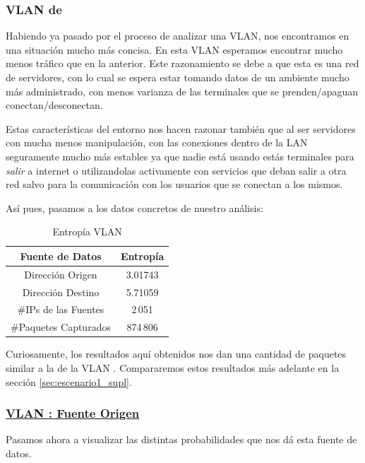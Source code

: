 \subsubsection{VLAN de~}
\par Habiendo ya pasado por el proceso de analizar una VLAN, nos encontramos en una
situaci\'on mucho m\'as concisa. En esta VLAN esperamos encontrar mucho menos tr\'afico
que en la anterior. Este razonamiento se debe a que esta es una red de servidores, con
lo cual se espera estar tomando datos de un ambiente mucho m\'as administrado, con
menos varianza de las terminales que se prenden/apaguan conectan/desconectan.

\par Estas caracter\'isticas del entorno nos hacen razonar tambi\'en que al ser
servidores con mucha menos manipulaci\'on, con las conexiones dentro de la LAN
seguramente mucho m\'as estables ya que nadie est\'a usando est\'as terminales
para \textit{salir} a internet o utilizandolas activamente con servicios que
deban salir a otra red salvo para la comunicaci\'on con los usuarios que se conectan
a los mismos.

\par As\'i pues, pasamos a los datos concretos de nuestro an\'alisis:

\begin{table}[!h]
\centering
  \begin{tabular}{c c}
    Fuente de Datos & Entrop\'ia \\
    \hline\hline
    Direcci\'on Origen & 3.01743 \\
    Direcci\'on Destino & 5.71059 \\
    \hline\hline
    \#IPs de las Fuentes & 2\,051\\
    \#Paquetes Capturados & 874\,806\\
    \hline
    \end{tabular}
  \bigskip
  \caption{Entrop\'ia VLAN }
  \label{tab:vlan20_entropia}
\end{table}

\par Curiosamente, los resultados aqu\'i obtenidos nos dan una cantidad de paquetes
similar a la de la VLAN . Compararemos estos resultados m\'as
adelante en la secci\'on \ref{sec:escenario1_supl}.


\subsubsection*{\underline{VLAN : Fuente Origen}}\label{subsubsec:vlan20_src}
\par Pasamos ahora a visualizar las distintas probabilidades que nos d\'a esta fuente de
datos.

